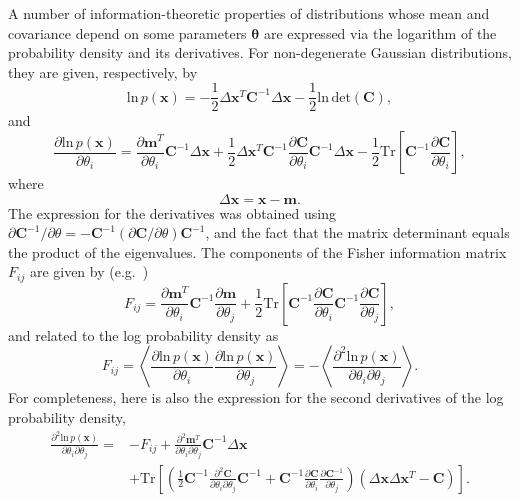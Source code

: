 \documentclass[a4paper,notitlepage]{article}
\renewcommand{\t}[1]{\mathrm{#1}}
\renewcommand{\b}[1]{\mathbf{#1}}
\begin{document}
A number of information-theoretic properties of distributions whose mean and covariance depend on some parameters $\b{\theta}$ are expressed via the logarithm of the probability density and its derivatives. For non-degenerate Gaussian distributions, they are given, respectively, by
\begin{equation}\label{eq:llk}
\t{ln}\,p(\b{x})=-\frac{1}{2}\Delta \b{x}^T\b{C}^{-1}\Delta \b{x}-\frac{1}{2}\t{ln}\,\t{det}(\b{C}),
\end{equation}
and
\begin{equation}
\frac{\partial\t{ln}\,p(\b{x})}{\partial \theta_i}=\frac{\partial \b{m}^T}{\partial \theta_i}\mathbf{C}^{-1}\Delta \b{x}+\frac{1}{2}\Delta \b{x}^T\mathbf{C}^{-1}\frac{\partial\mathbf{C}}{\partial \theta_i}\mathbf{C}^{-1}\Delta \b{x}-\frac{1}{2}\t{Tr}\left[\mathbf{C}^{-1}\frac{\partial\mathbf{C}}{\partial \theta_i}\right],
\end{equation}
where
\begin{equation}
\Delta \b{x} = \b{x}-\b{m}.
\end{equation}
The expression for the derivatives was obtained using $\partial\mathbf{C}^{-1}/\partial\theta=-\mathbf{C}^{-1}(\partial\mathbf{C}/\partial\theta)\mathbf{C}^{-1}$, and the fact that the matrix determinant equals the product of the eigenvalues.  
The components of the Fisher information matrix $F_{ij}$ are given by (e.g.~\cite{akimoto_theoretical_2012})
\begin{equation}
F_{ij}=\frac{\partial \b{m}^T}{\partial \theta_i}\mathbf{C}^{-1}\frac{\partial \b{m}}{\partial \theta_j}+\frac{1}{2}\t{Tr}\left[\mathbf{C}^{-1}\frac{\partial\mathbf{C}}{\partial \theta_i}\mathbf{C}^{-1}\frac{\partial\mathbf{C}}{\partial \theta_j}\right],
\end{equation} 
and related to the log probability density as
\begin{equation}\label{eq:FIMavg}
F_{ij}=\left\langle \frac{\partial\t{ln}\,p(\b{x})}{\partial\theta_i} \frac{\partial\t{ln}\,p(\b{x})}{\partial\theta_j}\right\rangle=-\left\langle \frac{\partial^2\t{ln}\,p(\b{x})}{\partial \theta_i\partial\theta_j}\right\rangle.
\end{equation}
For completeness, here is also the expression for the second derivatives of the log probability density,
\begin{align}
\frac{\partial^2\t{ln}\,p(\b{x})}{\partial \theta_i\partial\theta_j}=
&-F_{ij}+\frac{\partial^2 \b{m}^T}{\partial \theta_i\partial\theta_j}\mathbf{C}^{-1}\Delta \b{x} \nonumber\\
&+\t{Tr}\left[\left(\frac{1}{2}\mathbf{C}^{-1}\frac{\partial^2 \mathbf{C}}{\partial \theta_i\partial \theta_j}\mathbf{C}^{-1}+\mathbf{C}^{-1}\frac{\partial \mathbf{C}}{\partial \theta_i}\frac{\partial \mathbf{C}^{-1}}{\partial \theta_j}\right)\left(\Delta \b{x}\Delta \b{x}^T - \mathbf{C}\right)\right].
\end{align}



\end{document}
